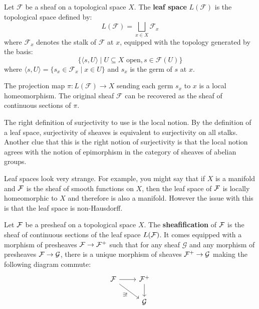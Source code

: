 \documentclass[12pt]{article}
\begin{document}
\begin{definition}
    Let $\mathcal{F}$ be a sheaf on a topological space $X$. The \textbf{leaf space} $L(\mathcal{F})$ is the topological space defined by:
    \[
        L(\mathcal{F}) = \bigsqcup_{x \in X} \mathcal{F}_x
    \]
    where $\mathcal{F}_x$ denotes the stalk of $\mathcal{F}$ at $x$, equipped with the topology generated by the basis:
    \[
        \{ \langle s, U \rangle \mid U \subseteq X \text{ open}, s \in \mathcal{F}(U) \}
    \]
    where $\langle s, U \rangle = \{ s_x \in \mathcal{F}_x \mid x \in U \}$ and $s_x$ is the germ of $s$ at $x$.
\end{definition}

\begin{remark}
    The projection map $\pi: L(\mathcal{F}) \to X$ sending each germ $s_x$ to $x$ is a local homeomorphism. The original sheaf $\mathcal{F}$ can be recovered as the sheaf of continuous sections of $\pi$.
\end{remark}



The right definition of surjectivity to use is the local notion. By the definition of a leaf space, surjectivity of sheaves is equivalent to surjectivity on all stalks. Another clue that this is the right notion of surjectivity is that the local notion agrees with the notion of epimorphism in the category of sheaves of abelian groups.

Leaf spaces look very strange. For example, you might say that if $X$ is a manifold and ${\mathcal{F}}$ is the sheaf of smooth functions on $X$, then the leaf space of ${\mathcal{F}}$ is locally homeomorphic to $X$ and therefore is also a manifold. However the issue with this is that the leaf space is non-Hausdorff.

\begin{definition}
    Let ${\mathcal{F}}$ be a presheaf on a topological space $X$. The \textbf{sheafification} of ${\mathcal{F}}$ is the sheaf of continuous sections of the leaf space $L({\mathcal{F}})$.
    It comes equipped with a morphism of presheaves ${\mathcal{F}} \to {\mathcal{F}}^+$ such that for any sheaf $\mathcal{G}$ and any morphism of presheaves ${\mathcal{F}} \to \mathcal{G}$, there is a unique morphism of sheaves ${\mathcal{F}}^+ \to \mathcal{G}$ making the following diagram commute:
    \[
        \begin{tikzcd}
            \cF \arrow[r] \arrow[dr, "\exists!"'] & \cF^+ \arrow[d] \\
            & \mathcal{G}
        \end{tikzcd}
    \]
\end{definition}
\end{document}
